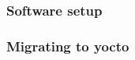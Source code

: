 \documentclass[../../main.tex]{subfiles}
\begin{document}
\subsubsection{Software setup}%
\label{ssub:software_setup}



\subsubsection{Migrating to yocto}%
\label{ssub:migrating_to_yocto}



%
\end{document}
